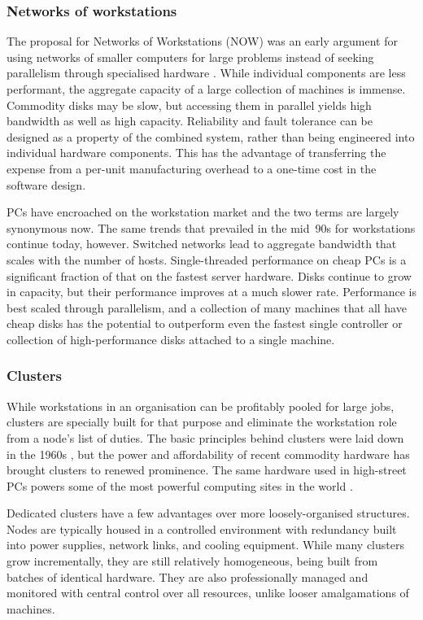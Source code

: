 \subsubsection{Networks of workstations}

The proposal for Networks of Workstations (NOW) was an early argument for using networks of smaller computers for large problems instead of seeking parallelism through specialised hardware \cite{anderson95a}. While individual components are less performant, the aggregate capacity of a large collection of machines is immense. Commodity disks may be slow, but accessing them in parallel yields high bandwidth as well as high capacity. Reliability and fault tolerance can be designed as a property of the combined system, rather than being engineered into individual hardware components. This has the advantage of transferring the expense from a per-unit manufacturing overhead to a one-time cost in the software design.

PCs have encroached on the workstation market and the two terms are largely synonymous now. The same trends that prevailed in the mid~90s for workstations continue today, however. Switched networks lead to aggregate bandwidth that scales with the number of hosts. Single-threaded performance on cheap PCs is a significant fraction of that on the fastest server hardware. Disks continue to grow in capacity, but their performance improves at a much slower rate. Performance is best scaled through parallelism, and a collection of many machines that all have cheap disks has the potential to outperform even the fastest single controller or collection of high-performance disks attached to a single machine.

\subsubsection{Clusters}

While workstations in an organisation can be profitably pooled for large jobs, clusters are specially built for that purpose and eliminate the workstation role from a node's list of duties. The basic principles behind clusters were laid down in the 1960s \cite{amdahl}, but the power and affordability of recent commodity hardware has brought clusters to renewed prominence. The same hardware used in high-street PCs powers some of the most powerful computing sites in the world \cite{top500}.

Dedicated clusters have a few advantages over more loosely-organised structures. Nodes are typically housed in a controlled environment with redundancy built into power supplies, network links, and cooling equipment. While many clusters grow incrementally, they are still relatively homogeneous, being built from batches of identical hardware. They are also professionally managed and monitored with central control over all resources, unlike looser amalgamations of machines.

